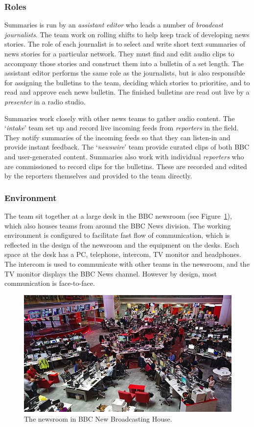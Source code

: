 \subsubsection{Roles}\label{sec:news-roles}
Summaries is run by an \textit{assistant editor} who leads a number of \textit{broadcast journalists}. The team work on
rolling shifts to help keep track of developing news stories. The role of each journalist is to select and write short
text summaries of news stories for a particular network. They must find and edit audio clips to accompany those stories
and construct them into a bulletin of a set length.  The assistant editor performs the same role as the journalists,
but is also responsible for assigning the bulletins to the team, deciding which stories to prioritise, and to read and
approve each news bulletin. The finished bulletins are read out live by a \textit{presenter} in a radio studio.

Summaries work closely with other news teams to gather audio content. The `\textit{intake}' team set up and record live
incoming feeds from \textit{reporters} in the field. They notify summaries of the incoming feeds so that they can
listen-in and provide instant feedback. The `\textit{newswire}' team provide curated clips of both BBC and
user-generated content. Summaries also work with individual \textit{reporters} who are commissioned to record clips for
the bulletins. These are recorded and edited by the reporters themselves and provided to the team directly.

\subsubsection{Environment}
The team sit together at a large desk in the BBC newsroom (see Figure~\ref{fig:newsroom}), which also houses teams from
around the BBC News division.  The working environment is configured to facilitate fast flow of communication, which is
reflected in the design of the newsroom and the equipment on the desks.  Each space at the desk has a PC, telephone,
intercom, TV monitor and headphones. The intercom is used to communicate with other teams in the newsroom, and the TV
monitor displays the BBC News channel. However by design, most communication is face-to-face.

\begin{figure}[ht]
  \centering
  \includegraphics[width=\columnwidth]{figs/newsroom.jpg}
  \caption{The newsroom in BBC New Broadcasting House.}
  \label{fig:newsroom}
\end{figure}

